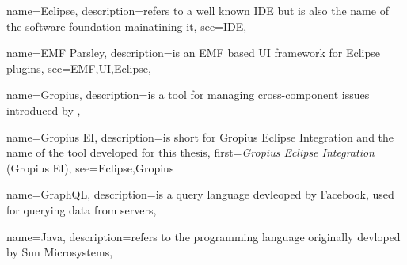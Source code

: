 
{
	name=Eclipse,
	description={refers to a well known IDE but is also the name of the software foundation mainatining it},
	see={IDE},
}



{
	name={EMF Parsley},
	description={is an EMF based UI framework for Eclipse plugins},
	see={EMF,UI,Eclipse},
}

{
	name=Gropius,
	description={is a tool for managing cross-component issues introduced by \cite{speth2020gropius}},
}


{
	name=Gropius EI,
	description={is short for Gropius Eclipse Integration and the name of the tool developed for this thesis},
	first={\emph{Gropius Eclipse Integration} (Gropius EI)},
	see={Eclipse,Gropius}
}

{
	name=GraphQL,
	description={is a query language devleoped by Facebook, used for querying data from servers},
}

{
	name=Java,
	description={refers to the programming language originally devloped by Sun Microsystems},
}